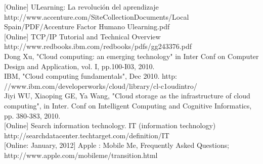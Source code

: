 \documentclass[journal]{IEEEtran}
\begin{document}
\begin{thebibliography}{1}
 [Online] ULearning: La revolución del aprendizaje http://www.accenture.com/SiteCollectionDocuments/Local Spain/PDF/Accenture Factor Humano Ulearning.pdf\\
 [Online] TCP/IP Tutorial and Technical Overview http://www.redbooks.ibm.com/redbooks/pdfs/gg243376.pdf\\
 Dong Xu, "Cloud computing: an emerging technology" in Inter Conf on Computer Design and Application, vol. I, pp.100-I03, 2010.\\
 IBM, "Cloud computing fundamentals", Dec 2010. 
http: //www.ibm.com/developerworks/cloud/library/cl-c1oudintro/\\
 Jiyi WU, Xiaoping GE, Ya Wang, "Cloud storage as the infrastructure of cloud computing", in Inter. Conf on Intelligent Computing and Cognitive Informatics, pp. 380-383, 2010.\\
 [Online] Search information technology. IT (information technology) http://searchdatacenter.techtarget.com/definition/IT\\
 [Online: January, 2012] Apple : Mobile Me, Frequently Asked Questions; http://www.apple.com/mobileme/transition.html\\

\end{thebibliography}
\end{document}
